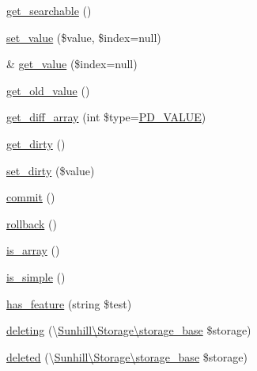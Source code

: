 \begin{DoxyCompactItemize}
\item 
\hyperlink{classSunhill_1_1Properties_1_1oo__property_af746bb17de220ac12dd9950062c348ee}{get\+\_\+searchable} ()
\item 
\hyperlink{classSunhill_1_1Properties_1_1oo__property_a31c27fe47542ee3577ddceb1f3d11e46}{set\+\_\+value} (\$value, \$index=null)
\item 
\& \hyperlink{classSunhill_1_1Properties_1_1oo__property_aedffb6fa7d76262582e6213f1002f876}{get\+\_\+value} (\$index=null)
\item 
\hyperlink{classSunhill_1_1Properties_1_1oo__property_a33d6cf9d9d2bf29e285f1fa4507fb333}{get\+\_\+old\+\_\+value} ()
\item 
\hyperlink{classSunhill_1_1Properties_1_1oo__property_a73c190f1ff0e35362b06d1e077bbce41}{get\+\_\+diff\+\_\+array} (int \$type=\hyperlink{namespaceSunhill_1_1Properties_a28c3de9e20fd246123a2853f7055117d}{P\+D\+\_\+\+V\+A\+L\+UE})
\item 
\hyperlink{classSunhill_1_1Properties_1_1oo__property_a5509007431816607291966c6ab7daa11}{get\+\_\+dirty} ()
\item 
\hyperlink{classSunhill_1_1Properties_1_1oo__property_a64dc45825ad1f50ab74b33c6175771f5}{set\+\_\+dirty} (\$value)
\item 
\hyperlink{classSunhill_1_1Properties_1_1oo__property_ab5f18cf6b7bae0ec0e045f7571b5d711}{commit} ()
\item 
\hyperlink{classSunhill_1_1Properties_1_1oo__property_a8e2e47b4d249c580ac27663a7df4c24c}{rollback} ()
\item 
\hyperlink{classSunhill_1_1Properties_1_1oo__property_a6687ed640d615043da265955f1670022}{is\+\_\+array} ()
\item 
\hyperlink{classSunhill_1_1Properties_1_1oo__property_a7b138af361f902e4099ee94fb5336e91}{is\+\_\+simple} ()
\item 
\hyperlink{classSunhill_1_1Properties_1_1oo__property_a769fec402fc0a73db9dcf265224058ea}{has\+\_\+feature} (string \$test)
\item 
\hyperlink{classSunhill_1_1Properties_1_1oo__property_af6667ff2516b31dbd3a0ae0f08efed7b}{deleting} (\textbackslash{}\hyperlink{classSunhill_1_1Storage_1_1storage__base}{Sunhill\textbackslash{}\+Storage\textbackslash{}storage\+\_\+base} \$storage)
\item 
\hyperlink{classSunhill_1_1Properties_1_1oo__property_af6b1f328ac45780977cedef3e3720466}{deleted} (\textbackslash{}\hyperlink{classSunhill_1_1Storage_1_1storage__base}{Sunhill\textbackslash{}\+Storage\textbackslash{}storage\+\_\+base} \$storage)

\end{DoxyCompactItemize}
